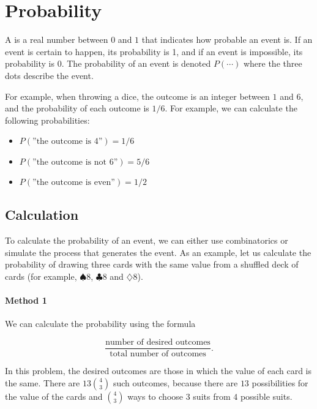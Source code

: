 \chapter{Probability}


A  is a real number between $0$ and $1$
that indicates how probable an event is.
If an event is certain to happen,
its probability is 1,
and if an event is impossible,
its probability is 0.
The probability of an event is denoted $P(\cdots)$
where the three dots describe the event.

For example, when throwing a dice,
the outcome is an integer between $1$ and $6$,
and the probability of each outcome is $1/6$.
For example, we can calculate the following probabilities:

\begin{itemize}[noitemsep]
\item $P(\textrm{''the outcome is 4''})=1/6$
\item $P(\textrm{''the outcome is not 6''})=5/6$
\item $P(\textrm{''the outcome is even''})=1/2$
\end{itemize}

\section{Calculation}

To calculate the probability of an event,
we can either use combinatorics
or simulate the process that generates the event.
As an example, let us calculate the probability
of drawing three cards with the same value
from a shuffled deck of cards
(for example, $\spadesuit 8$, $\clubsuit 8$ and $\diamondsuit 8$).

\subsubsection*{Method 1}

We can calculate the probability using the formula

\[\frac{\textrm{number of desired outcomes}}{\textrm{total number of outcomes}}.\]

In this problem, the desired outcomes are those
in which the value of each card is the same.
There are $13 {4 \choose 3}$ such outcomes,
because there are $13$ possibilities for the
value of the cards and ${4 \choose 3}$ ways to
choose $3$ suits from $4$ possible suits.

